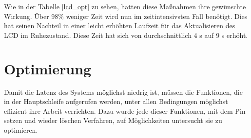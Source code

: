 Wie in der Tabelle \ref{lcd_opt} zu sehen, hatten diese Maßnahmen ihre gewünschte Wirkung. Über 98\% weniger Zeit
wird nun im zeitintensivsten Fall benötigt. Dies hat seinen Nachteil in einer leicht erhöhten Laufzeit für das
Aktualisieren des LCD im Ruhezustand. Diese Zeit hat sich von durchschnittlich 4 \textmu{}s auf 9 \textmu{}s erhöht.

\section{Optimierung}
Damit die Latenz des Systems möglichst niedrig ist, müssen die Funktionen, die in der Hauptschleife aufgerufen werden,
unter allen Bedingungen möglichst effizient ihre Arbeit verrichten. Dazu wurde jede dieser Funktionen, mit dem Pin setzen
und wieder löschen Verfahren, auf Möglichkeiten untersucht sie zu optimieren.

